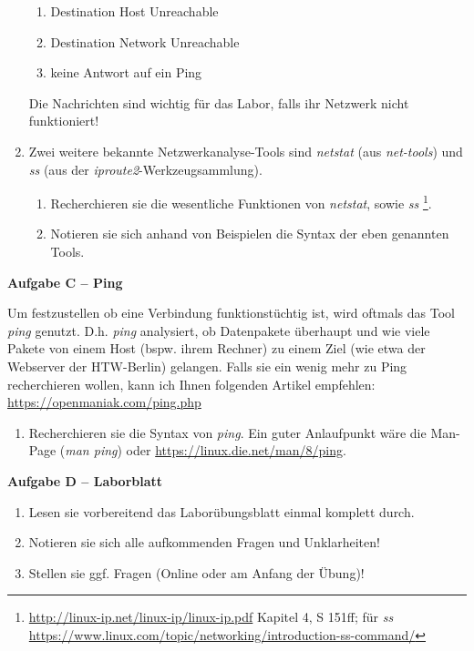 \documentclass[paper=a4,fontsize=11pt]{scrartcl}%
\numberwithin{equation}{section}
\begin{document}
\begin{enumerate}
\begin{enumerate}
		\item Destination Host Unreachable
		\item Destination Network Unreachable
		\item keine Antwort auf ein Ping
	\end{enumerate}
	Die Nachrichten sind wichtig für das Labor, falls ihr Netzwerk nicht funktioniert!
	\item Zwei weitere bekannte Netzwerkanalyse-Tools sind \emph{netstat} (aus \emph{net-tools}) und \emph{ss} (aus der \emph{iproute2}-Werkzeugsammlung).
	\begin{enumerate}
		\item Recherchieren sie die wesentliche Funktionen von \emph{netstat}, sowie \emph{ss} \footnote{\url{http://linux-ip.net/linux-ip/linux-ip.pdf} Kapitel 4, S 151ff; für \emph{ss} \url{https://www.linux.com/topic/networking/introduction-ss-command/}}.
		\item Notieren sie sich anhand von Beispielen die Syntax der eben genannten Tools. 
	\end{enumerate}
\end{enumerate}

\begin{center}\Large{\textbf{Aufgabe C -- Ping}}\end{center}
Um festzustellen ob eine Verbindung funktionstüchtig ist, wird oftmals das Tool \emph{ping} genutzt. D.h. \emph{ping} analysiert, ob Datenpakete überhaupt und wie viele Pakete von einem Host (bspw. ihrem Rechner) zu einem Ziel (wie etwa der Webserver der HTW-Berlin) gelangen. Falls sie ein wenig mehr zu Ping recherchieren wollen, kann ich Ihnen folgenden Artikel empfehlen: \url{https://openmaniak.com/ping.php}
\begin{enumerate}
	\item Recherchieren sie die Syntax von \emph{ping}. Ein guter Anlaufpunkt wäre die Man-Page (\emph{man ping}) oder \url{https://linux.die.net/man/8/ping}.
\end{enumerate}

\begin{center}\Large{\textbf{Aufgabe D -- Laborblatt}}\end{center}
\begin{enumerate}
	\item Lesen sie vorbereitend das Laborübungsblatt einmal komplett durch.
	\item Notieren sie sich alle aufkommenden Fragen und Unklarheiten!
	\item Stellen sie ggf. Fragen (Online oder am Anfang der Übung)! 
\end{enumerate}


\end{document}
